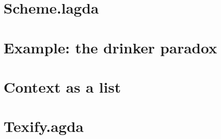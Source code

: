 \documentclass{article}
\theoremstyle{definition}
\theoremstyle{plain}
\begin{document}
\section{Scheme.lagda}


\section{Example: the drinker paradox}


{}


\begin{appendices}

\section{Context as a list}


\section{Texify.agda}
\inputminted{agda}{Texify.agda}

\end{appendices}
\end{document}
